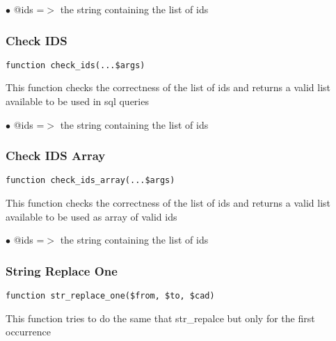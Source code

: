 \documentclass[a4paper]{article}
\begin{document}
\begin{compactitem}
\item[\color{myblue}$\bullet$] @ids =$>$ the string containing the list of ids
\end{compactitem}

\hypertarget{toc250}{}
\subsubsection{Check IDS}

\begin{lstlisting}
function check_ids(...$args)
\end{lstlisting}

This function checks the correctness of the list of ids and returns a valid
list available to be used in sql queries

\begin{compactitem}
\item[\color{myblue}$\bullet$] @ids =$>$ the string containing the list of ids
\end{compactitem}

\hypertarget{toc251}{}
\subsubsection{Check IDS Array}

\begin{lstlisting}
function check_ids_array(...$args)
\end{lstlisting}

This function checks the correctness of the list of ids and returns a valid
list available to be used as array of valid ids

\begin{compactitem}
\item[\color{myblue}$\bullet$] @ids =$>$ the string containing the list of ids
\end{compactitem}

\hypertarget{toc252}{}
\subsubsection{String Replace One}

\begin{lstlisting}
function str_replace_one($from, $to, $cad)
\end{lstlisting}

This function tries to do the same that str\_repalce but only for the first
occurrence
\end{document}
